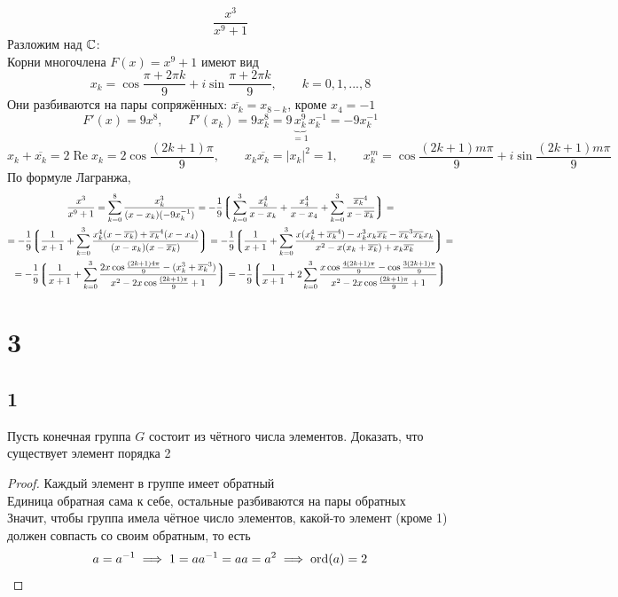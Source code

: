 $$ \frac{x^3}{x^9 + 1} $$
Разложим над $ \mathbb{C} $: \\
Корни многочлена $ F(x) = x^9 + 1 $ имеют вид
$$ x_k = \cos \frac{\pi + 2\pi k}9 + i \sin \frac{\pi + 2\pi k}9, \qquad k = 0, 1, ..., 8 $$
Они разбиваются на пары сопряжённых: $ \overline{x_k} = x_{8 - k} $, кроме $ x_4 = -1 $
$$ F'(x) = 9x^8, \qquad F'(x_k) = 9x_k^8 = 9\underbrace{x_k^9}_{= 1}x_k^{-1} = -9x_k^{-1} $$
$$ x_k + \overline{x_k} = 2\operatorname{Re}x_k = 2\cos \frac{(2k + 1)\pi}9, \qquad x_k\overline{x_k} = |x_k|^2 = 1, \qquad x_k^m = \cos \frac{(2k + 1)m\pi}9 + i \sin \frac{(2k + 1)m\pi}9 $$
По формуле Лагранжа,
\begin{multline*}
    \frac{x^3}{x^9 + 1} = \sum_{k = 0}^8 \frac{x_k^3}{(x - x_k)(-9x_k^{-1})} = -\frac19 \bigg\lgroup \sum_{k = 0}^3 \frac{x_k^4}{x - x_k} + \frac{x_4^4}{x - x_4} + \sum_{k = 0}^3 \frac{\overline{x_k}^4}{x - \overline{x_k}} \bigg\rgroup = \\
    = -\frac19 \bigg\lgroup \frac1{x + 1} + \sum_{k = 0}^3 \frac{x_k^4(x - \overline{x_k}) + \overline{x_k}^4(x - x_4)}{(x - x_k)(x - \overline{x_k})} \bigg\rgroup = -\frac19 \bigg\lgroup \frac1{x + 1} + \sum_{k = 0}^3 \frac{x(x_k^4 + \overline{x_k}^4) - x_k^3x_k\overline{x_k} - \overline{x_k}^3\overline{x_k}x_k}{x^2 - x(x_k + \overline{x_k}) + x_k\overline{x_k}} \bigg\rgroup = \\
    = -\frac19 \bigg\lgroup \frac1{x + 1} + \sum_{k = 0}^3 \frac{2x\cos\frac{(2k + 1)4\pi}9 - (x_k^3 + \overline{x_k}^3)}{x^2 - 2x\cos\frac{(2k + 1)\pi}9 + 1} \bigg\rgroup = -\frac19 \bigg\lgroup \frac1{x + 1} + 2\sum_{k = 0}^3 \frac{x\cos\frac{4(2k + 1)\pi}9 - \cos\frac{3(2k + 1)\pi}9}{x^2 - 2x\cos\frac{(2k + 1)\pi}9 + 1} \bigg\rgroup
\end{multline*}

\section{3}

\subsection{1}

\begin{statement}
	Пусть конечная группа $ G $ состоит из чётного числа элементов. Доказать, что существует элемент порядка 2
\end{statement}

\begin{proof}
	Каждый элемент в группе имеет обратный \\
    Единица обратная сама к себе, остальные разбиваются на пары обратных \\
    Значит, чтобы группа имела чётное число элементов, какой-то элемент (кроме 1) должен совпасть со своим обратным, то есть
    $$ a = a^{-1} \implies 1 = aa^{-1} = aa = a^2 \implies \operatorname{ord}(a) = 2 $$
\end{proof}

